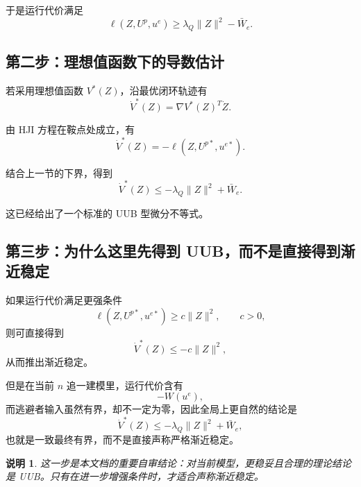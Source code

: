 \documentclass[12pt,a4paper]{ctexart}
\newtheorem{remark}{说明}
\begin{document}
于是运行代价满足
\begin{equation}
\ell(Z,U^p,u^e)
\ge
\lambda_Q\|Z\|^2-\bar W_e.
\end{equation}

\subsection{第二步：理想值函数下的导数估计}

若采用理想值函数 $V^*(Z)$，沿最优闭环轨迹有
\begin{equation}
\dot V^*(Z)
=
\nabla V^*(Z)^T\dot Z.
\end{equation}

由 HJI 方程在鞍点处成立，有
\begin{equation}
\dot V^*(Z)=-\ell(Z,U^{p*},u^{e*}).
\end{equation}

结合上一节的下界，得到
\begin{equation}
\dot V^*(Z)
\le
-\lambda_Q\|Z\|^2+\bar W_e.
\end{equation}

这已经给出了一个标准的 UUB 型微分不等式。

\subsection{第三步：为什么这里先得到 UUB，而不是直接得到渐近稳定}

如果运行代价满足更强条件
\begin{equation}
\ell(Z,U^{p*},u^{e*})\ge c\|Z\|^2,\qquad c>0,
\end{equation}
则可直接得到
\begin{equation}
\dot V^*(Z)\le -c\|Z\|^2,
\end{equation}
从而推出渐近稳定。

但是在当前 $n$ 追一建模里，运行代价含有
\begin{equation}
-W(u^e),
\end{equation}
而逃避者输入虽然有界，却不一定为零，因此全局上更自然的结论是
\begin{equation}
\dot V^*(Z)\le -\lambda_Q\|Z\|^2+\bar W_e,
\end{equation}
也就是一致最终有界，而不是直接声称严格渐近稳定。

\begin{remark}
这一步是本文档的重要自审结论：对当前模型，更稳妥且合理的理论结论是 UUB。只有在进一步增强条件时，才适合声称渐近稳定。
\end{remark}
\end{document}
